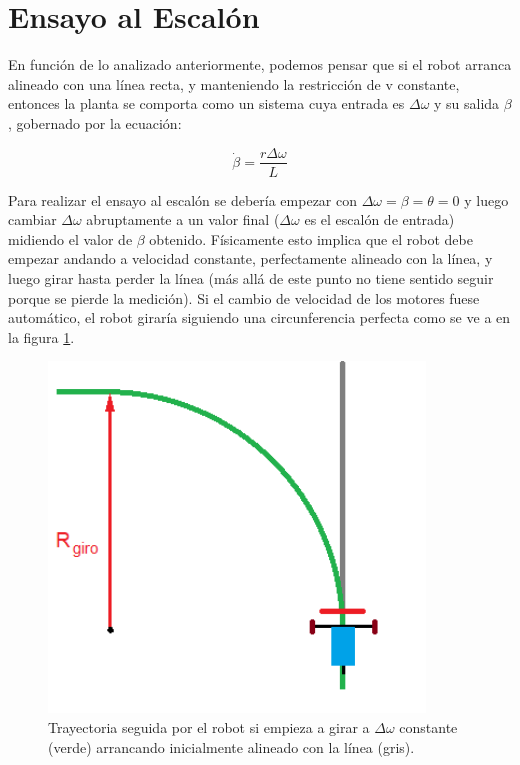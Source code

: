 \documentclass[10pt,conference,a4paper,onecolumn]{article}%
\begin{document}
\section{Ensayo al Escalón}

En función de lo analizado anteriormente, podemos pensar que si el robot arranca alineado con una línea recta, y manteniendo la restricción de v constante, entonces la planta se comporta como un sistema cuya entrada es $\Delta \omega$ y su salida $\beta $, gobernado por la ecuación:

\begin{equation}
\dot{\beta}= \frac{r\Delta\omega}{L} 
\label{eq:sys_tot_teo} 
\end{equation}

Para realizar el ensayo al escalón se debería empezar con $\Delta \omega = \beta = \theta=0$  y luego cambiar $\Delta \omega$  abruptamente a un valor final ($\Delta \omega$  es el escalón de entrada) midiendo el valor de $\beta$ obtenido. Físicamente esto implica que el robot debe empezar andando a velocidad constante, perfectamente alineado con la línea, y luego girar hasta perder la línea (más allá de este punto no tiene sentido seguir porque se pierde la medición).
Si el cambio de velocidad de los motores fuese automático, el robot giraría siguiendo una circunferencia perfecta como se ve a en la figura \ref{fig:carritoEsc}.

\begin{figure}[h]
\centering
\includegraphics[width=10cm]{./imagenes/carrito_Ensayo_escalon.png}
\caption{Trayectoria seguida por el robot si empieza a girar a $\Delta \omega $ constante (verde) arrancando inicialmente alineado con la línea (gris).}
\label{fig:carritoEsc}
\end{figure}
\end{document}
